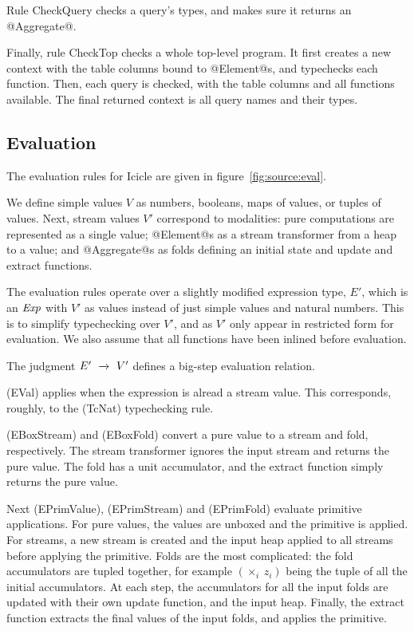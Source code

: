 Rule CheckQuery checks a query's types, and makes sure it returns an @Aggregate@.

Finally, rule CheckTop checks a whole top-level program.
It first creates a new context with the table columns bound to @Element@s, and typechecks each function.
Then, each query is checked, with the table columns and all functions available.
The final returned context is all query names and their types.

\subsection{Evaluation}

The evaluation rules for Icicle are given in figure~\ref{fig:source:eval}.

We define simple values $V$ as numbers, booleans, maps of values, or tuples of values.
Next, stream values $V'$ correspond to modalities: pure computations are represented as a single value;
@Element@s as a stream transformer from a heap to a value;
and @Aggregate@s as folds defining an initial state and update and extract functions.

The evaluation rules operate over a slightly modified expression type, $E'$, which is an $\mathit{Exp}$ with $V'$ as values instead of just simple values and natural numbers.
This is to simplify typechecking over $V'$, and as $V'$ only appear in restricted form for evaluation.
We also assume that all functions have been inlined before evaluation.

The judgment $E' ~\xrightarrow~~ V'$ defines a big-step evaluation relation.

(EVal) applies when the expression is alread a stream value.
This corresponds, roughly, to the (TcNat) typechecking rule.

(EBoxStream) and (EBoxFold) convert a pure value to a stream and fold, respectively.
The stream transformer ignores the input stream and returns the pure value.
The fold has a unit accumulator, and the extract function simply returns the pure value.

Next (EPrimValue), (EPrimStream) and (EPrimFold) evaluate primitive applications.
For pure values, the values are unboxed and the primitive is applied.
For streams, a new stream is created and the input heap applied to all streams before applying the primitive.
Folds are the most complicated: the fold accumulators are tupled together, for example $(\times_i~z_i)$ being the tuple of all the initial accumulators.
At each step, the accumulators for all the input folds are updated with their own update function, and the input heap.
Finally, the extract function extracts the final values of the input folds, and applies the primitive.

